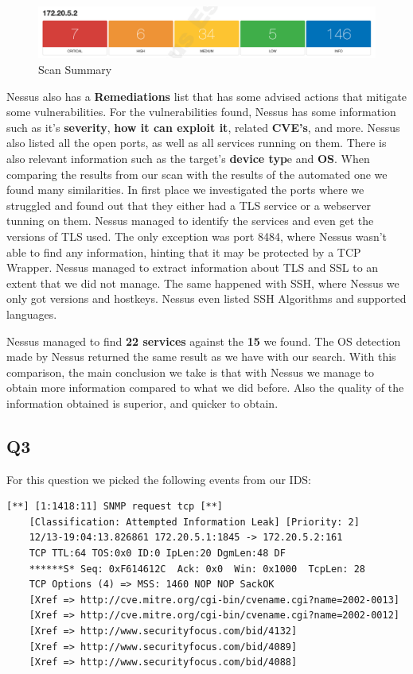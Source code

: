 \begin{figure}[ht!]
 	\centering
 	\includegraphics[width=1\linewidth]{img/vuln0.png}
 	\caption{Scan Summary}
\end{figure}

Nessus also has a \textbf{Remediations} list that has some advised actions that mitigate some vulnerabilities. For the vulnerabilities found, Nessus has some information such as it's \textbf{severity}, \textbf{how it can exploit it}, related \textbf{CVE's}, and more. Nessus also listed all the open ports, as well as all services running on them. There is also relevant information such as the target's \textbf{device typ}e and \textbf{OS}.
When comparing the results from our scan with the results of the automated one we found many similarities. In first place we investigated the ports where we struggled and found out that they either had a TLS service or a webserver tunning on them. Nessus managed to identify the services and even get the versions of TLS used. The only exception was port 8484, where Nessus wasn't able to find any information, hinting that it may be protected by a TCP Wrapper.
Nessus managed to extract information about TLS and SSL to an extent that we did not manage. The same happened with SSH, where Nessus we only got versions and hostkeys. Nessus even listed SSH Algorithms and supported languages.

Nessus managed to find \textbf{22 services} against the \textbf{15} we found. The OS detection made by Nessus returned the same result as we have with our search. With this comparison, the main conclusion we take is that with Nessus we manage to obtain more information compared to what we did before. Also the quality of the information obtained is superior, and quicker to obtain.

\subsection{Q3}

For this question we picked the following events from our IDS:\\

\begin{lstlisting}[basicstyle=\scriptsize]
    [**] [1:1418:11] SNMP request tcp [**]
    [Classification: Attempted Information Leak] [Priority: 2] 
    12/13-19:04:13.826861 172.20.5.1:1845 -> 172.20.5.2:161
    TCP TTL:64 TOS:0x0 ID:0 IpLen:20 DgmLen:48 DF
    ******S* Seq: 0xF614612C  Ack: 0x0  Win: 0x1000  TcpLen: 28
    TCP Options (4) => MSS: 1460 NOP NOP SackOK 
    [Xref => http://cve.mitre.org/cgi-bin/cvename.cgi?name=2002-0013]
    [Xref => http://cve.mitre.org/cgi-bin/cvename.cgi?name=2002-0012]
    [Xref => http://www.securityfocus.com/bid/4132]
    [Xref => http://www.securityfocus.com/bid/4089]
    [Xref => http://www.securityfocus.com/bid/4088]
\end{lstlisting}

